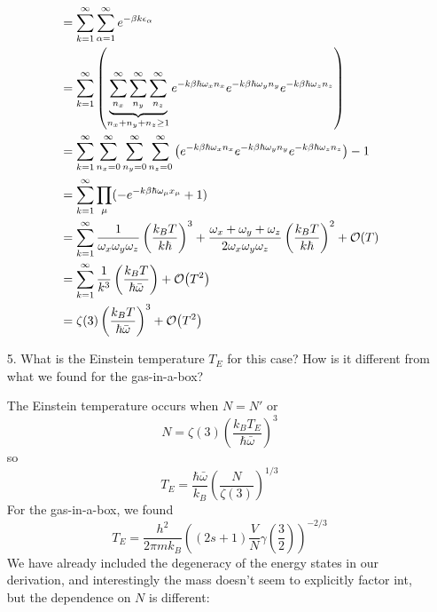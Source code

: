 \documentclass[a4paper,twoside]{article}
\begin{document}
\begin{itemize}
\begin{problem}
\begin{align}
                &= \sum_{k=1}^{\infty} \sum_{\alpha=1}^{\infty} e^{- \beta k \epsilon_{\alpha}} \\
                &= \sum_{k=1}^{\infty} \left( \underbrace{\sum_{n_x}^{\infty} \sum_{n_y}^{\infty} \sum_{n_z}^{\infty}}_{n_x + n_y + n_z \geq 1} e^{-k \beta \hbar \omega_x n_x} e^{-k \beta \hbar \omega_y n_y} e^{-k \beta \hbar \omega_z n_z} \right) \\
                &= \sum_{k=1}^{\infty} \sum_{n_x=0}^{\infty} \sum_{n_y=0}^{\infty} \sum_{n_z=0}^{\infty} \left( e^{-k \beta \hbar \omega_x n_x} e^{-k \beta \hbar \omega_y n_y} e^{-k \beta \hbar \omega_z n_z} \right) - 1 \\
                &= \sum_{k=1}^{\infty} \prod_{\mu} (- e^{-k \beta \hbar \omega_{\mu} x_{\mu}} + 1) \\
                &= \sum_{k=1}^{\infty} \frac{1}{\omega_x \omega_y \omega_z} \left( \frac{k_B T}{k \hbar} \right)^3 + \frac{\omega_x + \omega_y + \omega_z}{2 \omega_x \omega_y \omega_z} \left( \frac{k_B T}{k \hbar} \right)^2 + \order{T} \\
                &= \sum_{k=1}^{\infty} \frac{1}{k^3} \left( \frac{k_B T}{\hbar \bar{\omega}} \right) + \order{T^2} \\
                &= \zeta(3) \left( \frac{k_B T}{\hbar \bar{\omega}} \right)^3 + \order{T^2}
            \end{align}
        \end{problem}
    \item[5.] What is the Einstein temperature $ T_E $ for this case? How is it different from what we found for the gas-in-a-box?
        \begin{problem}
            The Einstein temperature occurs when $ N = N' $ or 
            \begin{equation}
                N = \zeta(3) \left( \frac{k_B T_E}{\hbar \bar{\omega}} \right)^3
            \end{equation}
            so
            \begin{equation}
                T_E = \frac{\hbar \bar{\omega}}{k_B} \left( \frac{N}{\zeta(3)} \right)^{1/3}
            \end{equation}
            For the gas-in-a-box, we found
            \begin{equation}
                T_E = \frac{h^2}{2 \pi m k_B} \left( (2s+1) \frac{V}{N} \gamma \left( \frac{3}{2} \right) \right)^{-2/3}
            \end{equation}
            We have already included the degeneracy of the energy states in our derivation, and interestingly the mass doesn't seem to explicitly factor int, but the dependence on $ N $ is different:

\end{problem}
\end{itemize}
\end{document}
